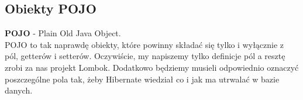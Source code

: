 \documentclass{article}
\begin{document}
        \subsection{Obiekty POJO}
            \textbf{POJO} - Plain Old Java Object.\\
            POJO to tak naprawdę obiekty, które powinny składać się tylko i wyłącznie z pól, getterów i setterów. Oczywiście, my napiszemy tylko definicje pól a resztę zrobi za nas projekt Lombok. Dodatkowo będziemy musieli odpowiednio oznaczyć poszczególne pola tak, żeby Hibernate wiedział co i jak ma utrwalać w bazie danych.
\end{document}
